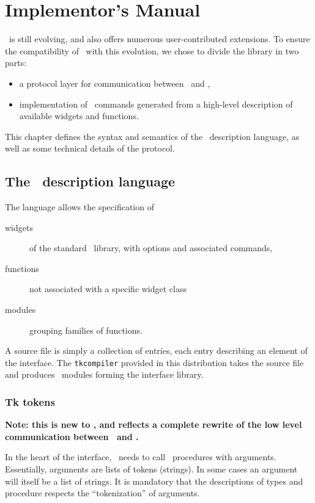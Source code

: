 \chapter{Implementor's Manual}
\label{chap:impl}
\tk\ is still evolving, and also offers numerous user-contributed
extensions. To ensure the compatibility of \camltk\ with this evolution,
we chose to divide the library in two parts:
\begin{itemize}
\item a protocol layer for communication between \caml\ and \tcl,
\item implementation of \tk\ commands generated from  a high-level
description of available widgets and functions.
\end{itemize} 

This chapter defines the syntax and semantics of the \camltk\ description
language, as well as some technical details of the protocol.

\section{The \camltk\ description language}
The language allows the specification of
\begin{description}
\item[widgets] of the standard \tk\ library, with options and associated
commands,
\item[functions] not associated with a specific widget class
\item[modules] grouping families of functions.
\end{description} 

A source file is simply a collection of entries, each entry describing an
element of the interface. The {\tt tkcompiler} provided in this distribution
takes the source file and produces \caml\ modules forming the interface
library.

\subsection{Tk tokens}
{\bf Note: this is new to \thisrelease, and reflects a complete rewrite of
the low level communication between \caml\ and \tcl\tk.}

In the heart of the interface, \caml\ needs to call \tcl\tk\ procedures with
arguments. Essentially, arguments are lists of tokens (strings). In some
cases an argument will itself be a list of strings. It is mandatory that the
descriptions of types and procedure respects the ``tokenization'' of
arguments. 

